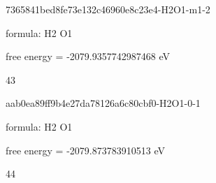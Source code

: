 \documentclass{article}
\begin{document}
\vspace{1cm}


7365841bed8fe73e132c46960e8c23e4-H2O1-m1-2



formula: H2 O1



free energy = -2079.9357742987468 eV

43

\vspace{1cm}


aab0ea89ff9b4e27da78126a6c80cbf0-H2O1-0-1



formula: H2 O1



free energy = -2079.873783910513 eV

44
\end{document}
